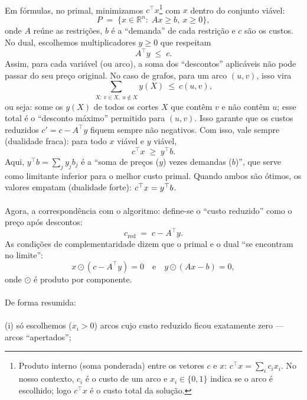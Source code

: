 \documentclass[12pt,a4paper]{article}
\begin{document}
\paragraph{}
Em fórmulas, no primal, minimizamos \(c^\top x\)\footnote{Produto interno (soma ponderada) entre os vetores \(c\) e \(x\): \(c^\top x=\sum_i c_i x_i\). No nosso contexto, \(c_i\) é o custo de um arco e \(x_i\in\{0,1\}\) indica se o arco é escolhido; logo \(c^\top x\) é o custo total da solução.} com \(x\) dentro do conjunto viável:
\[
    P\;=\;\{x\in\mathbb{R}^n:\; Ax\ge b,\ x\ge 0\},
\]
onde \(A\) reúne as restrições, \(b\) é a “demanda” de cada restrição e \(c\) são os custos. No dual, escolhemos multiplicadores \(y\ge 0\) que respeitam
\[
    A^\top y\;\le\; c.
\]
Assim, para cada variável (ou arco), a soma dos “descontos” aplicáveis não pode passar do seu preço original. No caso de grafos, para um arco \((u,v)\), isso vira
\[
    \sum_{X:\, v\in X,\ u\notin X} y(X)\ \le\ c(u,v),
\]
ou seja: some os \(y(X)\) de todos os cortes \(X\) que contêm \(v\) e não contêm \(u\); esse total é o “desconto máximo” permitido para \((u,v)\). Isso garante que os custos reduzidos \(c' = c - A^\top y\) fiquem sempre não negativos.
Com isso, vale sempre (dualidade fraca): para todo \(x\) viável e \(y\) viável,
\[
    c^\top x\;\ge\; y^\top b.
\]
Aqui, \(y^\top b=\sum_j y_j b_j\) é a “soma de preços (\(y\)) vezes demandas (\(b\))”, que serve como limitante inferior para o melhor custo primal.
Quando ambos são ótimos, os valores empatam (dualidade forte): \(c^\top x^{\*}=y^{\*\top} b\).

\paragraph{}
Agora, a correspondência com o algoritmo: define-se o “custo reduzido” como o preço após descontos:
\[
    c_{\text{red}}\;=\;c - A^\top y.
\]
As condições de complementaridade dizem que o primal e o dual “se encontram no limite”:
\[
    x\odot(c - A^\top y)=0\quad\text{e}\quad y\odot(Ax-b)=0,
\]
onde \(\odot\) é produto por componente.

\paragraph{}
De forma resumida:
\paragraph{}
(i) só escolhemos (\(x_i>0\)) arcos cujo custo reduzido ficou exatamente zero — arcos “apertados”; 
\end{document}
